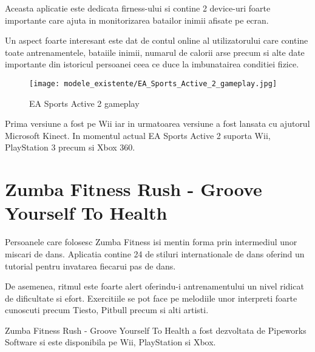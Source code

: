 \documentclass[12pt,a4paper]{report}
\begin{document}
Aceasta aplicatie este dedicata firness-ului si contine 2 device-uri foarte importante care ajuta  in monitorizarea batailor inimii afisate pe ecran. 

Un aspect foarte interesant este dat de contul online al utilizatorului care contine toate antrenamentele, bataiile inimii, numarul de calorii arse precum si alte date importante din istoricul persoanei ceea ce duce la imbunatairea conditiei fizice.

\begin{figure}[th]
\centering
\texttt{[image: modele\_existente/EA\_Sports\_Active\_2\_gameplay.jpg]}
  \caption[EA Sports Active 2 Gameplay]{EA Sports Active 2 gameplay\protect\footnotemark}
  \label{figure_1:picture_6}
\end{figure}

Prima versiune a fost pe Wii iar in urmatoarea versiune a fost lansata cu ajutorul Microsoft Kinect. In momentul actual EA Sports Active 2 suporta Wii, PlayStation 3 precum si Xbox 360.


\section{Zumba Fitness Rush - Groove Yourself To Health}

Persoanele care folosesc Zumba Fitness isi mentin forma prin intermediul unor miscari de dans. Aplicatia contine 24 de stiluri internationale de dans oferind un tutorial pentru invatarea fiecarui pas de dans. 

De asemenea, ritmul este foarte alert oferindu-i antrenamentului un nivel ridicat de dificultate si efort. Exercitiile se pot face pe melodiile unor interpreti foarte cunoscuti precum Tiesto, Pitbull precum si alti artisti. 

Zumba Fitness Rush - Groove Yourself To Health a fost dezvoltata de Pipeworks Software si este disponibila pe Wii, PlayStation si Xbox.
\end{document}
